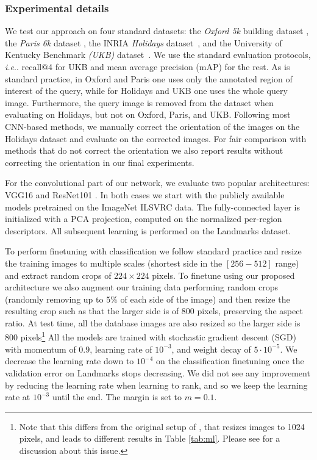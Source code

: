 \documentclass[twocolumn]{svjour3}          \smartqed  \usepackage{graphicx}
\makeatletter
\DeclareRobustCommand\onedot{\futurelet\@let@token\@onedot}
\def\@onedot{\ifx\@let@token.\else.\null\fi\xspace}
\def\ie{\emph{i.e}\onedot} \def\Ie{\emph{I.e}\onedot}
\makeatother
\begin{document}
\subsubsection{Experimental details}
We test our approach on four standard datasets: the \textit{Oxford 5k} building dataset \citep{Philbin2007}, the \textit{Paris 6k} dataset
\citep{Philbin2008}, the INRIA \textit{Holidays} dataset~\citep{Jegou2008}, and the University of Kentucky Benchmark \textit{(UKB)} dataset~\citep{Nister2006}.
We use the standard evaluation protocols, \ie recall@4 for UKB and mean average precision (mAP) for the rest.
As is standard practice, in Oxford and Paris one uses only the annotated region of interest of the query, while for Holidays and UKB one uses the whole query image.
Furthermore, the query image is removed from the dataset when evaluating on Holidays, but not on Oxford, Paris, and UKB.
Following most CNN-based methods, we manually correct the orientation of the images on the Holidays dataset and evaluate on the corrected images.
For fair comparison with methods that do not correct the orientation we also report results without correcting the orientation in our final experiments.
 
For the convolutional part of our network, we evaluate two popular architectures: VGG16  \citep{Simonyan2015verydeep} and ResNet101 \citep{He2016}. In both cases we start with the publicly available models pretrained on the ImageNet ILSVRC data. The fully-connected layer is initialized with a PCA projection, computed on the normalized per-region descriptors. 
All subsequent learning is performed on the Landmarks dataset.

To perform finetuning with classification we follow standard practice and resize the training images to multiple scales (shortest side in the $\left[256-512\right]$ range) and extract random crops of $224\times 224$ pixels.
To finetune using our proposed architecture we also augment our training data performing random crops (randomly removing up to $5\%$ of each side of the image) and then resize the resulting crop such as that the larger side is of $800$ pixels, preserving the aspect ratio. At test time, all the database images are also resized so the larger side is $800$ pixels\footnote{Note that this differs from the original setup of \cite{Tolias2016}, that resizes images to 1024 pixels, and leads to different results in Table \ref{tab:ml}. Please see \cite{gordo2016deep} for a discussion about this issue.}
All the models are trained with stochastic gradient descent (SGD)  with momentum of $0.9$, learning rate of $10^{-3}$, and weight decay of $5\cdot 10^{-5}$. We decrease the learning rate down to $10^{-4}$ on the classification finetuning once the validation error on Landmarks stops decreasing. We did not see any improvement by reducing the learning rate when learning to rank, and so we keep the learning rate at $10^{-3}$ until the end. 
The margin is set to $m=0.1$. 
\end{document}
